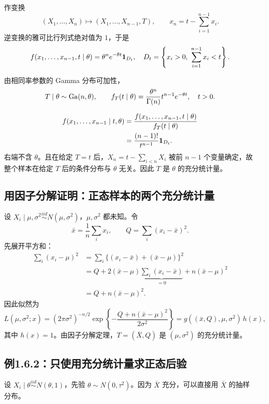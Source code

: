 作变换
\[
(X_1,\ldots,X_n)\longmapsto(X_1,\ldots,X_{n-1},T),
\qquad x_n=t-\sum_{i=1}^{n-1}x_i.
\]
逆变换的雅可比行列式绝对值为 $1$，于是
\[
f(x_1,\ldots,x_{n-1},t\mid\theta)
=\theta^ne^{-\theta t}\ind_{D_t},
\quad D_t=\left\{x_i>0,\ \sum_{i=1}^{n-1}x_i<t\right\}.
\]

由相同率参数的 Gamma 分布可加性，
\[
T\mid\theta\sim\operatorname{Ga}(n,\theta),\qquad
f_T(t\mid\theta)=\frac{\theta^n}{\Gamma(n)}t^{n-1}e^{-\theta t},\quad t>0.
\]

\begin{align*}
f(x_1,\ldots,x_{n-1}\mid t,\theta)
&=\frac{f(x_1,\ldots,x_{n-1},t\mid\theta)}{f_T(t\mid\theta)}\\
&=\frac{(n-1)!}{t^{n-1}}\mathbf{1}_{D_t}.
\end{align*}
右端不含 $\theta$。且在给定 $T=t$ 后，$X_n=t-\sum_{i<n}X_i$ 被前 $n-1$ 个变量确定，故整个样本在给定 $T$ 后的条件分布与 $\theta$ 无关。因此 $T$ 是 $\theta$ 的充分统计量。

\subsection{用因子分解证明：正态样本的两个充分统计量}
设 $X_i\mid\mu,\sigma^2\overset{iid}{\sim}N(\mu,\sigma^2)$，$\mu,\sigma^2$ 都未知。令
\[
\bar x=\frac1n\sum_i x_i,\qquad Q=\sum_i(x_i-\bar x)^2.
\]
先展开平方和：
\begin{align*}
\sum_i(x_i-\mu)^2
&=\sum_i\{(x_i-\bar x)+(\bar x-\mu)\}^2\\
&=Q+2(\bar x-\mu)\underbrace{\sum_i(x_i-\bar x)}_{=0}
+n(\bar x-\mu)^2\\
&=Q+n(\bar x-\mu)^2.
\end{align*}
因此似然为
\[
L(\mu,\sigma^2;x)=(2\pi\sigma^2)^{-n/2}
\exp\left\{-\frac{Q+n(\bar x-\mu)^2}{2\sigma^2}\right\}
=g((\bar x,Q),\mu,\sigma^2)\,h(x),
\]
其中 $h(x)=1$。由因子分解定理，$T=(\bar X,Q)$ 是 $(\mu,\sigma^2)$ 的充分统计量。

\subsection{例1.6.2：只使用充分统计量求正态后验}
设 $X_i\mid\theta\overset{iid}{\sim}N(\theta,1)$，先验 $\theta\sim N(0,\tau^2)$。因为 $\bar X$ 充分，可以直接用 $\bar X$ 的抽样分布。

